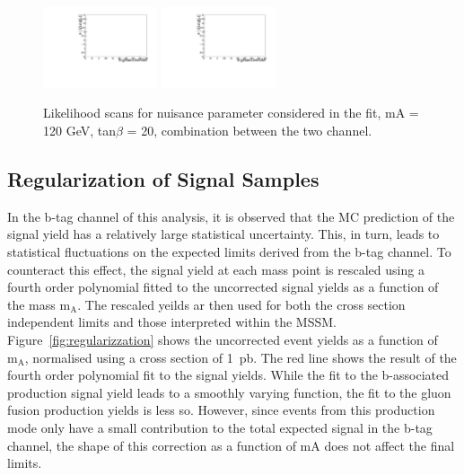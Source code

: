 \begin{figure}[htp]
\begin{center}
            \includegraphics[page=51,width=0.3\textwidth]{figure/np_check/comb_LLHscan_f.pdf}
            \includegraphics[page=52,width=0.3\textwidth]{figure/np_check/comb_LLHscan_f.pdf}\\

    \end{center}
    \caption{ Likelihood scans for nuisance parameter considered in the fit,  mA = 120 GeV, tan$\beta$ = 20, combination between the two channel.} 
    \label{fig:llh_3}
\end{figure}

\clearpage
\subsection{Regularization of Signal Samples}

In the b-tag channel of this analysis, it is observed that the MC prediction of the signal yield has a relatively large statistical uncertainty. This, in turn, 
leads to statistical fluctuations on the expected limits derived from the b-tag channel. To counteract this effect, the signal yield at each mass 
point is rescaled using a fourth order polynomial fitted to the uncorrected signal yields as a function of the mass $\mathrm{m_A}$. The rescaled yeilds ar then used for both the cross section independent limits and those interpreted within the MSSM. Figure~\ref{fig:regularizzation} shows 
the uncorrected event yields as a function of $\mathrm{m_A}$, normalised using a cross section of 1~pb.  The red line shows the result of the fourth order polynomial fit 
to the signal yields. While the fit to the b-associated production signal yield leads to a smoothly varying function, the fit to the gluon fusion production 
yields is less so. However, since events from this production mode only have a small contribution to the total expected signal in the b-tag channel, the shape of this correction as a function of mA does not affect the final limits.


